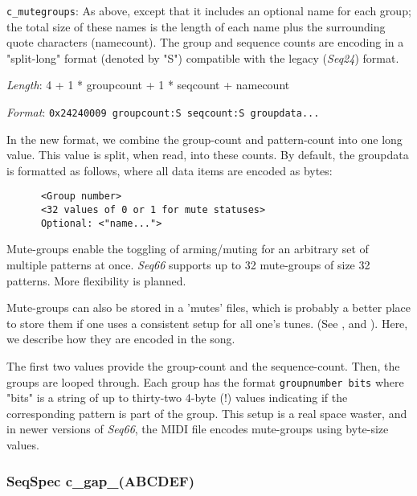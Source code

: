    \begin{description}
      \item \texttt{c\_mutegroups}: As above, except that it
         includes an optional name for each group; the total size of these
         names is the length of each name plus the surrounding quote
         characters (namecount).  The group and sequence counts are encoding in
         a "split-long" format (denoted by "S") compatible with the legacy
         (\textsl{Seq24}) format.
      \item \textsl{Length}: 4 + 1 * groupcount + 1 * seqcount + namecount
      \item \textsl{Format}: \texttt{0x24240009 groupcount:S seqcount:S groupdata...}
   \end{description}

   In the new format, we combine the group-count and pattern-count into
   one long value. This value is split, when read, into these counts.
   By default, the groupdata is formatted as follows, where all data items are
   encoded as bytes:

   \begin{verbatim}
      <Group number>
      <32 values of 0 or 1 for mute statuses>
      Optional: <"name...">
   \end{verbatim}

   Mute-groups enable the toggling of arming/muting for an arbitrary set of
   multiple patterns at once.  \textsl{Seq66} supports up to 32 mute-groups of
   size 32 patterns.  More flexibility is planned.

   Mute-groups can also be stored in a 'mutes' files, which is probably a better
   place to store them if one uses a consistent setup for all one's tunes.
   (See , and
   ).
   Here, we describe how they are encoded in the song.

   The first two values provide the group-count and the sequence-count.
   Then, the groups are looped through. Each group has the format
   \texttt{groupnumber bits} where "bits" is a string of up to thirty-two
   4-byte (!) values indicating if the corresponding pattern is part of
   the group.  This setup is a real space waster, and in newer versions of
   \textsl{Seq66}, the MIDI file encodes mute-groups using byte-size values.

\subsubsection{SeqSpec c\_gap\_(ABCDEF)}
\label{subsubsec:midi_format_track_seqspec_gap_abcdef}

